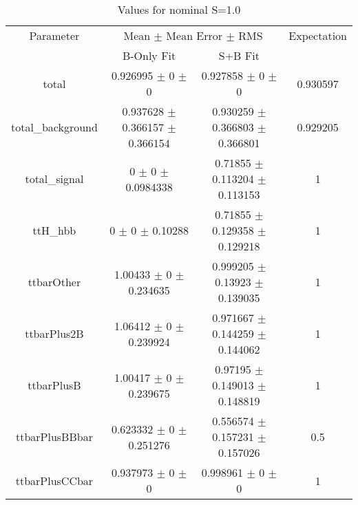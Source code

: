 \begin{table}
\centering
\caption{Values for nominal S=1.0}
\begin{tabular}{cccc}
\toprule
Parameter & \multicolumn{2}{c}{Mean $\pm$ Mean Error $\pm$ RMS} & Expectation\\
 & B-Only Fit & S+B Fit & \\
\midrule
total & \num{0.926995} $\pm$ \num{0} $\pm$ \num{0} & \num{0.927858} $\pm$ \num{0} $\pm$ \num{0} & \num{0.930597}\\
total\_background & \num{0.937628} $\pm$ \num{0.366157} $\pm$ \num{0.366154} & \num{0.930259} $\pm$ \num{0.366803} $\pm$ \num{0.366801} & \num{0.929205}\\
total\_signal & \num{0} $\pm$ \num{0} $\pm$ \num{0.0984338} & \num{0.71855} $\pm$ \num{0.113204} $\pm$ \num{0.113153} & \num{1}\\
ttH\_hbb & \num{0} $\pm$ \num{0} $\pm$ \num{0.10288} & \num{0.71855} $\pm$ \num{0.129358} $\pm$ \num{0.129218} & \num{1}\\
ttbarOther & \num{1.00433} $\pm$ \num{0} $\pm$ \num{0.234635} & \num{0.999205} $\pm$ \num{0.13923} $\pm$ \num{0.139035} & \num{1}\\
ttbarPlus2B & \num{1.06412} $\pm$ \num{0} $\pm$ \num{0.239924} & \num{0.971667} $\pm$ \num{0.144259} $\pm$ \num{0.144062} & \num{1}\\
ttbarPlusB & \num{1.00417} $\pm$ \num{0} $\pm$ \num{0.239675} & \num{0.97195} $\pm$ \num{0.149013} $\pm$ \num{0.148819} & \num{1}\\
ttbarPlusBBbar & \num{0.623332} $\pm$ \num{0} $\pm$ \num{0.251276} & \num{0.556574} $\pm$ \num{0.157231} $\pm$ \num{0.157026} & \num{0.5}\\
ttbarPlusCCbar & \num{0.937973} $\pm$ \num{0} $\pm$ \num{0} & \num{0.998961} $\pm$ \num{0} $\pm$ \num{0} & \num{1}\\
\bottomrule
\end{tabular}
\end{table}